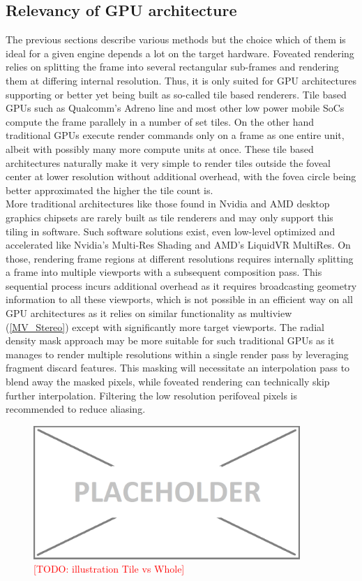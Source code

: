 \subsection{Relevancy of GPU architecture}
The previous sections describe various methods but the choice which of them is ideal for a given engine depends a lot on the target hardware. Foveated rendering relies on splitting the frame into several rectangular sub-frames and rendering them at differing internal resolution. Thus, it is only suited for GPU architectures supporting or better yet being built as so-called tile based renderers. Tile based GPUs such as Qualcomm's Adreno line and most other low power mobile SoCs compute the frame parallely in a number of set tiles. On the other hand traditional GPUs execute render commands only on a frame as one entire unit, albeit with possibly many more compute units at once. These tile based architectures naturally make it very simple to render tiles outside the foveal center at lower resolution without additional overhead, with the fovea circle being better approximated the higher the tile count is. \\
More traditional architectures like those found in Nvidia and AMD desktop graphics chipsets are rarely built as tile renderers and may only support this tiling in software. Such software solutions exist, even low-level optimized and accelerated like Nvidia's Multi-Res Shading\cite{NvidiaCorporation.2016} and AMD's LiquidVR MultiRes\cite{Gallagher.2016}. On those, rendering frame regions at different resolutions requires internally splitting a frame into multiple viewports with a subsequent composition pass. This sequential process incurs additional overhead as it requires broadcasting geometry information to all these viewports, which is not possible in an efficient way on all GPU architectures as it relies on similar functionality as multiview (\autoref{MV_Stereo}) except with significantly more target viewports. The radial density mask approach may be more suitable for such traditional GPUs as it manages to render multiple resolutions within a single render pass by leveraging fragment discard features. This masking will necessitate an interpolation pass to blend away the masked pixels, while foveated rendering can technically skip further interpolation. Filtering the low resolution perifoveal pixels is recommended to reduce aliasing. 

\begin{figure}[htb]
  \centering
  \includegraphics[width=0.9\textwidth]{pictures/placeholder}
  \caption{\textcolor{red}{[TODO: illustration Tile vs Whole]}} \label{fig:blob}
\end{figure}